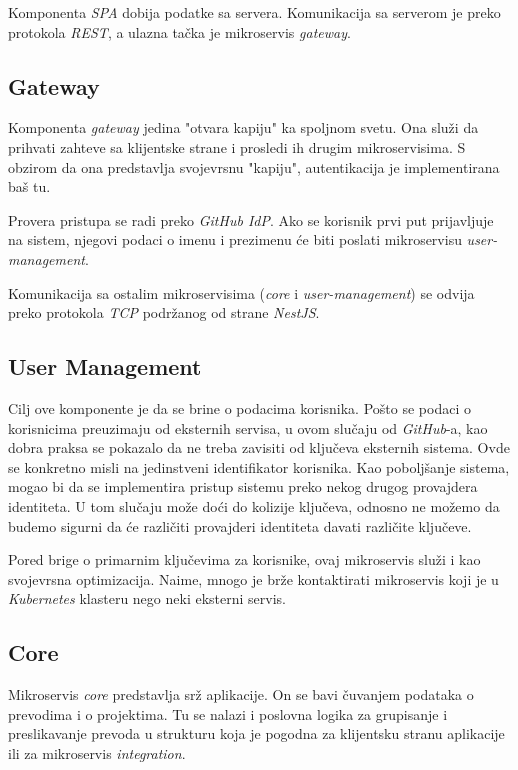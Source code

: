 Komponenta \textit{SPA} dobija podatke sa servera. Komunikacija sa serverom 
je preko protokola \textit{REST}, a ulazna tačka je mikroservis \textit{gateway}.

\subsection{Gateway}
Komponenta \textit{gateway} jedina "otvara kapiju" ka spoljnom svetu.
Ona služi da prihvati zahteve sa klijentske strane i prosledi ih 
drugim mikroservisima. S obzirom da ona predstavlja svojevrsnu "kapiju",
autentikacija je implementirana baš tu.

Provera pristupa se radi preko \textit{GitHub IdP}. Ako se korisnik 
prvi put prijavljuje na sistem, njegovi podaci o imenu i prezimenu će 
biti poslati mikroservisu \textit{user-management}. 

Komunikacija sa ostalim mikroservisima (\textit{core} i \textit{user-management})
se odvija preko protokola \textit{TCP} podržanog od strane \textit{NestJS}.

\subsection{User Management}
Cilj ove komponente je da se brine o podacima korisnika. Pošto se podaci o korisnicima 
preuzimaju od eksternih servisa, u ovom slučaju od \textit{GitHub}-a, kao dobra praksa se 
pokazalo da ne treba zavisiti od ključeva eksternih sistema. 
Ovde se konkretno misli na jedinstveni identifikator korisnika. Kao 
poboljšanje sistema, mogao bi da se implementira pristup sistemu preko 
nekog drugog provajdera identiteta. U tom slučaju može doći do kolizije 
ključeva, odnosno ne možemo da budemo sigurni da će različiti provajderi identiteta 
davati različite ključeve.

Pored brige o primarnim ključevima za korisnike, ovaj mikroservis služi 
i kao svojevrsna optimizacija. Naime, mnogo je brže kontaktirati 
mikroservis koji je u \textit{Kubernetes} klasteru nego neki eksterni 
servis.

\subsection{Core}
Mikroservis \textit{core} predstavlja srž aplikacije. On se bavi čuvanjem 
podataka o prevodima i o projektima. Tu se nalazi i poslovna logika za 
grupisanje i preslikavanje prevoda u strukturu koja je pogodna za 
klijentsku stranu aplikacije ili za mikroservis \textit{integration}.

